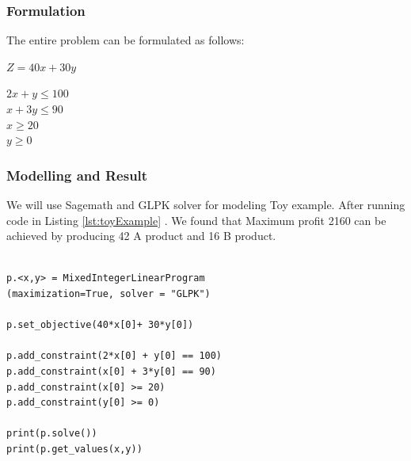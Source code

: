 \documentclass [version=final]{iacrcc}
\begin{document}
\subsubsection{Formulation}
The entire problem can be formulated as follows:

\begin{center}
    $  Z = 40x + 30y $ 
\end{center}
\begin{center}
    $ 2x + y \leq 100 $ \\
    $ x + 3y \leq 90 $ \\
    $ x \geq 20 $ \\
    $ y \geq 0 \quad $
\end{center}

\subsubsection{Modelling and Result}

We will use Sagemath and GLPK solver for modeling Toy example. After running code in Listing  \ref{lst:toyExample} . We found that Maximum profit 2160 can be achieved by producing  42 A product and 16 B product.
\begin{lstlisting}[caption={Sagemath MILP modelling of toy example }, label={lst:toyExample}]

p.<x,y> = MixedIntegerLinearProgram 
(maximization=True, solver = "GLPK")

p.set_objective(40*x[0]+ 30*y[0])

p.add_constraint(2*x[0] + y[0] == 100)
p.add_constraint(x[0] + 3*y[0] == 90)
p.add_constraint(x[0] >= 20)
p.add_constraint(y[0] >= 0)

print(p.solve())
print(p.get_values(x,y))

\end{lstlisting}
\end{document}
